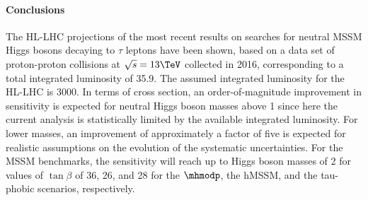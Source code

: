 \paragraph{Conclusions}
\label{sec:conclusions}
%
The HL-LHC projections of the most recent results on searches for neutral 
MSSM Higgs bosons decaying to $\tau$ leptons have been shown,
based on a data set of proton-proton collisions at $\sqrt{s}=13\TeV$
collected in 2016, 
corresponding to a total integrated luminosity of 35.9\fbinv.
The assumed integrated luminosity for the HL-LHC is 3000\fbinv.
In terms of cross section, 
an order-of-magnitude improvement in sensitivity
is expected for neutral Higgs boson masses above 1 \UTeV 
since here the current analysis is statistically limited by the 
available integrated luminosity. For lower masses, an improvement of 
approximately a factor of five is expected for realistic
assumptions on the evolution of the systematic uncertainties.
For the MSSM benchmarks,
the sensitivity will reach up to Higgs boson masses
of 2 \UTeV for values of $\tan \beta$ of 36, 26, and 28  
for the $\mhmodp$, the hMSSM, and the tau-phobic scenarios,
respectively.